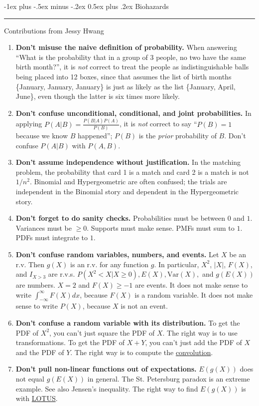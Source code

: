 \documentclass[10pt,landscape]{article}
\makeatletter
\newcommand{\var}{\textrm{Var}}
\renewcommand{\section}{\@startsection{section}{1}{0mm}%
                                {-1ex plus -.5ex minus -.2ex}%
                                {0.5ex plus .2ex}%
                                {\normalfont\large\bfseries}}
\makeatother
\begin{document}
\begin{multicols*}{3}
\section{Biohazards} \smallskip \hrule height 2pt \smallskip

Contributions from Jessy Hwang

\begin{enumerate} 
\item \textbf{Don't misuse the naive definition of probability.}   When answering ``What is the probability that in a group of 3 people, no two have the same birth month?'', it is \emph{not} correct to treat the people as indistinguishable balls being placed into 12 boxes, since that assumes the list of birth months \{January, January, January\} is just as likely as the list \{January, April, June\}, even though the latter is six times more likely. \\ 
\item \textbf{Don't confuse unconditional, conditional, and joint probabilities.}  In applying $P(A|B) = \frac{P(B|A)P(A)}{P(B)}$, it is \emph{not} correct to say ``$P(B) = 1$ because we know  $B$ happened''; $P(B)$ is the \emph{prior} probability of $B$. Don't confuse $P(A|B)$ with $P(A,B)$. \\
\item \textbf{Don't assume independence without justification.}  In the matching problem, the probability that card 1 is a match and card 2 is a match is not $1/n^2$.  Binomial and Hypergeometric are often confused; the trials are independent in the Binomial story and dependent in the Hypergeometric story. \\
\item \textbf{Don't forget to do sanity checks.} Probabilities must be between $0$ and $1$. Variances must be $\geq 0$. Supports must make sense. PMFs must sum to $1$. PDFs must integrate to $1$. \\
\item \textbf{Don't confuse random variables, numbers, and events.}  Let $X$ be an r.v. Then $g(X)$ is an r.v. for any function $g$. In particular, $X^2$, $|X|$, $F(X)$, and $I_{X>3}$ are r.v.s. $P(X^2 < X | X \geq 0), E(X), \var(X), $ and $g(E(X))$ are numbers. $X = 2$ and $F(X) \geq -1$ are events. It does not make sense to write $\int_{-\infty}^\infty F(X) dx$, because $F(X)$ is a random variable. It does not make sense to write $P(X)$, because $X$ is not an event. \\
\item \textbf{Don't confuse a random variable with its distribution.}  To get the PDF of $X^2$, you can't just square the PDF of $X$. The right way is to use transformations. To get the PDF of $X + Y$, you can't just add the PDF of $X$ and the PDF of $Y$. The right way is to compute the \hyperref[convolutions]{convolution}.
\item \textbf{Don't pull non-linear functions out of expectations.} $E(g(X))$ does not equal $g(E(X))$ in general. The St. Petersburg paradox is an extreme example.  See also Jensen's inequality. The right way to find $E(g(X))$ is with \hyperref[lotus]{LOTUS}.
\end{enumerate}


\end{multicols*}
\end{document}
